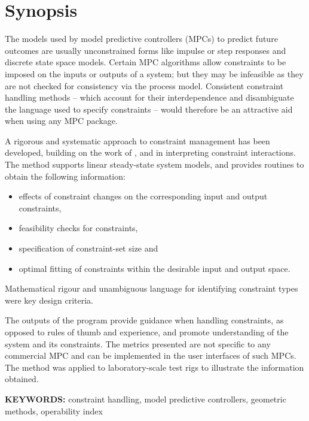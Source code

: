 \chapter*{Synopsis}
The models used by model predictive controllers (MPCs) to predict future outcomes are usually unconstrained forms like impulse or step responses and discrete state space models. 
Certain MPC algorithms allow constraints  to be imposed on the inputs or outputs of a system; but they may be infeasible as they are not checked for consistency via the process model. 
Consistent constraint handling methods -- which account for their interdependence and disambiguate the language used to specify constraints -- would therefore be an attractive aid when using any MPC package.

A rigorous and systematic approach to constraint management has been developed, building on the work of \citet{vinsonphd}, \citet{limaphd} and \citet{opconproc} in interpreting constraint interactions. 
The method supports linear steady-state system models, and provides routines to obtain the following information:
\begin{itemize}
  \item effects of constraint changes on the corresponding input and output constraints,
  \item feasibility checks for constraints,
  \item specification of constraint-set size and
  \item optimal fitting of constraints within the desirable input and output space.
\end{itemize}
Mathematical rigour and unambiguous language for identifying constraint types were key design criteria. 

The outputs of the program provide guidance when handling constraints, as opposed to rules of thumb and experience, and promote understanding of the system and its constraints.
The metrics presented are not specific to any commercial MPC and can be implemented in the user interfaces of such MPCs.
The method was applied to laboratory-scale test rigs to illustrate the information obtained.
\bigskip

\noindent \textbf{KEYWORDS:} constraint handling, model predictive
controllers, geometric methods, operability index

